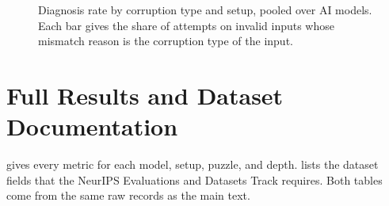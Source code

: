 \documentclass[10pt,twocolumn,letterpaper]{article}
\begin{document}
\begin{figure}[t]
\caption{Diagnosis rate by corruption type and setup, pooled over AI models. Each bar gives the share of attempts on invalid inputs whose mismatch reason is the corruption type of the input.}
\label{fig:diagnosis}
\end{figure}

\section{Full Results and Dataset Documentation}\label{app:full}
 gives every metric for each model, setup, puzzle, and depth.  lists the dataset fields that the NeurIPS Evaluations and Datasets Track requires. Both tables come from the same raw records as the main text.

\begin{table}[t]
\caption{Full results for each AI model, setup, puzzle, and scramble depth. Columns give all metrics with 95\% bootstrap intervals, plus consistency, tokens per attempt, latency, and cost efficiency.}
\label{tab:full}
\end{table}

\begin{table}[t]
\caption{Dataset documentation for the Croissant metadata file. The table lists the Responsible AI fields, the licence, the hosting location, and the DOI.}
\label{tab:datasheet}
\end{table}
\end{document}
